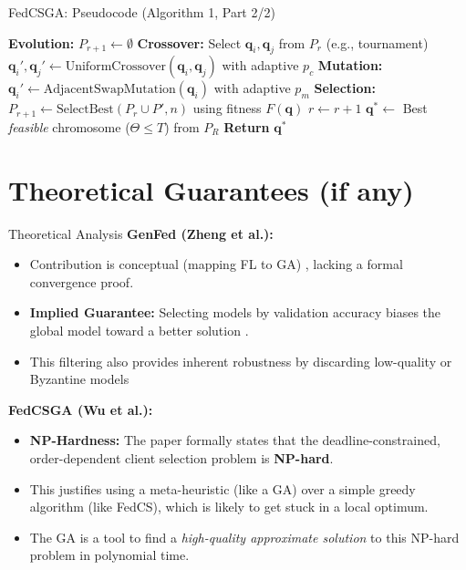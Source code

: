 \documentclass{beamer}
\begin{document}
\begin{frame}[fragile]{FedCSGA: Pseudocode (Algorithm 1, Part 2/2)}
\begin{algorithmic}[1]
\scriptsize
\setcounter{ALC@line}{11} %
\STATE \textbf{Evolution:}
    \STATE $P_{r+1} \leftarrow \emptyset$
    \STATE \textbf{Crossover:}
        \STATE Select $\mathbf{q}_i, \mathbf{q}_j$ from $P_r$ (e.g., tournament)
        \STATE $\mathbf{q}_i', \mathbf{q}_j' \leftarrow \text{UniformCrossover}(\mathbf{q}_i, \mathbf{q}_j)$ with adaptive $p_c$
    \ENDFOR
    \STATE \textbf{Mutation:}
        \STATE $\mathbf{q}_i' \leftarrow \text{AdjacentSwapMutation}(\mathbf{q}_i)$ with adaptive $p_m$
    \ENDFOR
    \STATE \textbf{Selection:}
    \STATE $P_{r+1} \leftarrow \text{SelectBest}(P_r \cup P', n)$ using fitness $F(\mathbf{q})$
    \STATE $r \leftarrow r+1$
\ENDWHILE
\STATE $\mathbf{q}^* \leftarrow$ Best \textit{feasible} chromosome ($\Theta \le T$) from $P_R$
\STATE \textbf{Return} $\mathbf{q}^*$
\end{algorithmic}
\end{frame}


\section{Theoretical Guarantees (if any)}

\begin{frame}{Theoretical Analysis}
\textbf{\textcolor{genfedblue}{GenFed} (Zheng et al.):}
\begin{itemize}
    \item Contribution is conceptual (mapping FL to GA) , lacking a formal convergence proof.
    \item \textbf{Implied Guarantee:} Selecting models by validation accuracy biases the global model toward a better solution .
    \item This filtering also provides inherent robustness by discarding low-quality or Byzantine models
\end{itemize}

\vspace{0.4cm}

\textbf{\textcolor{fedcsgaorange}{FedCSGA} (Wu et al.):}
\begin{itemize}
    \item \textbf{NP-Hardness:} The paper formally states that the deadline-constrained, order-dependent client selection problem is \textbf{NP-hard}.
    \item This justifies using a meta-heuristic (like a GA) over a simple greedy algorithm (like FedCS), which is likely to get stuck in a local optimum.
    \item The GA is a tool to find a \textit{high-quality approximate solution} to this NP-hard problem in polynomial time.
\end{itemize}
\end{frame}
\end{document}
